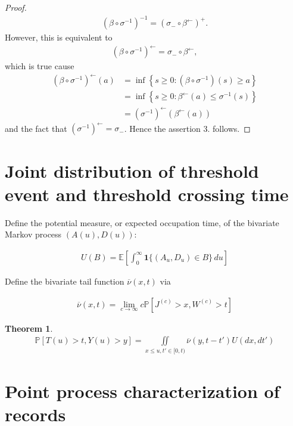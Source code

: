 \documentclass[12pt, a4paper]{article}
\newtheorem{theorem}[equation]{Theorem}
\newcommand{\ex}{\mathbb {E}}
\newcommand{\pr}{\mathbb {P}}
\newcommand{\1}{\mathbf 1}
\begin{document}
\begin{proof}
\begin{align*}
(\beta \circ \sigma^{-1})^{-1}=(\sigma_{-} \circ \beta^{\leftarrow})^{+}.
\end{align*}
However, this is equivalent to
\begin{align*}
(\beta \circ \sigma^{-1})^{\leftarrow} = \sigma_{-} \circ \beta^{\leftarrow},
\end{align*}
which is true cause 
\begin{align*}
(\beta \circ \sigma^{-1})^{\leftarrow}(a)&=\inf \left\{s \geq 0: (\beta \circ \sigma^{-1})(s) \geq a\right\}\\
&=\inf \left\{ s \geq 0: \beta^{\leftarrow}(a) \leq \sigma^{-1}(s) \right\}\\
&=(\sigma^{-1})^{\leftarrow}(\beta^{\leftarrow}(a))
\end{align*}
and the fact that $(\sigma^{-1})^{\leftarrow}=\sigma_{-}$. Hence the assertion 3. follows.

\end{proof}





\section{Joint distribution of threshold event and threshold crossing time}

Define the potential measure, or expected occupation time, of the bivariate 
Markov process $(A(u),D(u))$:

\begin{align*}
U(B) = \ex \left[ \int_0^\infty \mathbf 1\{ (A_u, D_u) \in B\}\,du \right]
\end{align*}

Define the bivariate tail function $\overline \nu(x,t)$ via 

\begin{align}
\overline \nu(x,t) = \lim_{c \to \infty} c \pr [J^{(c)} > x, W^{(c)} > t]
\end{align}


\begin{theorem}
\begin{align}
\pr [T(u) > t, Y(u) > y]
= \iint\limits_{x \le u, t' \in [0,t)} \overline \nu(y, t - t') U(dx, dt')
\end{align}
\end{theorem}


\section{Point process characterization of records}
\label{sec:records}
\end{document}
